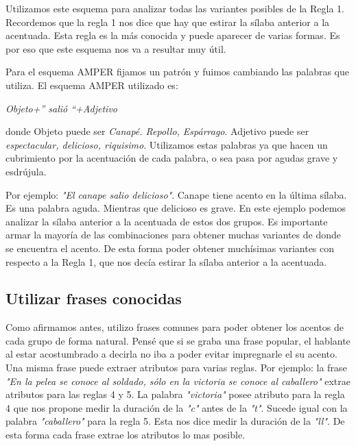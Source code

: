 \documentclass[11pt,a4paper,twoside]{tesis}
\begin{document}
Utilizamos este esquema para analizar todas las variantes posibles de la Regla 1. Recordemos que la regla 1 nos dice que hay que estirar la sílaba anterior a la acentuada. Esta regla es la más conocida y puede aparecer de varias formas. Es por eso que este esquema nos va a resultar muy útil. 

Para el esquema AMPER fijamos un patrón y fuimos cambiando las palabras que utiliza. 
El esquema AMPER utilizado es: 
\begin{center}
\textit{Objeto+” salió “+Adjetivo} 
\end{center}
donde Objeto puede ser \textit{Canapé. Repollo, Espárrago}. Adjetivo puede ser \textit{espectacular, delicioso, riquisimo}. Utilizamos estas palabras ya que hacen un cubrimiento por la acentuación de cada palabra, o sea pasa por agudas grave y esdrújula. 

Por ejemplo: \textit{"El canape salio delicioso"}. Canape tiene acento en la última sílaba. Es una palabra aguda. Mientras que delicioso es grave. En este ejemplo podemos analizar la sílaba anterior a la acentuada de estos dos grupos. Es importante armar la mayoría de las combinaciones para obtener muchas variantes de donde se encuentra el acento. De esta forma poder obtener muchísimas variantes con respecto a la Regla 1, que nos decía estirar la sílaba anterior a la acentuada.   


\subsection{Utilizar frases conocidas}

Como afirmamos antes, utilizo frases comunes para poder obtener los acentos de cada grupo de forma natural. Pensé que si se graba una frase popular, el hablante al estar acostumbrado a decirla no iba a poder evitar impregnarle el su acento. Una misma frase puede extraer atributos para varias reglas. Por ejemplo: la frase \textit{"En la pelea se conoce al soldado, sólo en la victoria se conoce al caballero"} extrae atributos para las reglas 4 y 5. La palabra \textit{"victoria"} posee atributo para la regla 4 que nos propone medir la duración de la \textit{"c"} antes de la \textit{"t"}. Sucede igual con la palabra \textit{"caballero"} para la regla 5. Esta nos dice medir la duración de la \textit{"ll"}. De esta forma cada frase extrae los atributos lo mas posible.
\end{document}
